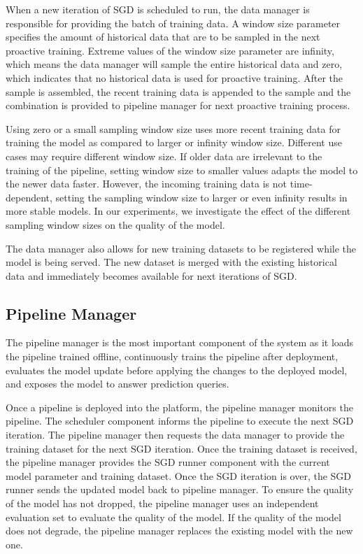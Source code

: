 When a new iteration of SGD is scheduled to run, the data manager is responsible for providing the batch of training data.
A window size parameter specifies the amount of historical data that are to be sampled in the next proactive training.
Extreme values of the window size parameter are infinity, which means the data manager will sample the entire historical data and zero, which indicates that no historical data is used for proactive training.
After the sample is assembled, the recent training data is appended to the sample and the combination is provided to pipeline manager for next proactive training process.

Using zero or a small sampling window size uses more recent training data for training the model as compared to larger or infinity window size.
Different use cases may require different window size.
If older data are irrelevant to the training of the pipeline, setting window size to smaller values adapts the model to the newer data faster.
However, the incoming training data is not time-dependent, setting the sampling window size to larger or even infinity results in more stable models.
In our experiments, we investigate the effect of the different sampling window sizes on the quality of the model.

The data manager also allows for new training datasets to be registered while the model is being served.
The new dataset is merged with the existing historical data and immediately becomes available for next iterations of SGD.

\subsection{Pipeline Manager} \label{pipeline-manager} 
The pipeline manager is the most important component of the system as it loads the pipeline trained offline, continuously trains the pipeline after deployment, evaluates the model update before applying the changes to the deployed model, and exposes the model to answer prediction queries.

Once a pipeline is deployed into the platform, the pipeline manager monitors the pipeline.
The scheduler component informs the pipeline to execute the next SGD iteration.
The pipeline manager then requests the data manager to provide the training dataset for the next SGD iteration.
Once the training dataset is received, the pipeline manager provides the SGD runner component with the current model parameter and training dataset.
Once the SGD iteration is over, the SGD runner sends the updated model back to pipeline manager.
To ensure the quality of the model has not dropped, the pipeline manager uses an independent evaluation set to evaluate the quality of the model.
If the quality of the model does not degrade, the pipeline manager replaces the existing model with the new one.

